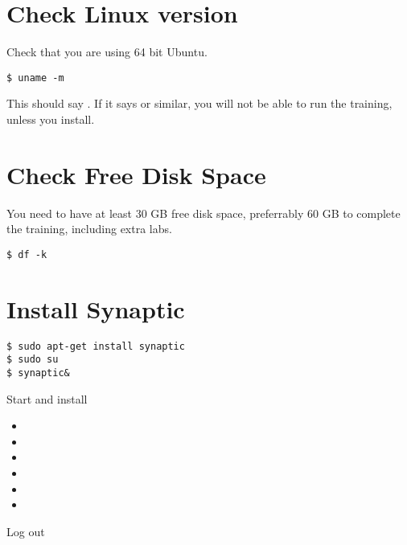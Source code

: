 
\section{Check Linux version}
Check that you are using 64 bit Ubuntu.

\begin{verbatim}
$ uname -m
\end{verbatim}

This should say . If it says 
or similar, you will not be able to run the training,
unless you install.

\section{Check Free Disk Space}

You need to have at least 30 GB free disk space, preferrably 60 GB
to complete the training, including extra labs.

\begin{verbatim}
$ df -k
\end{verbatim}

\section{Install Synaptic}

\begin{verbatim}
$ sudo apt-get install synaptic
$ sudo su
$ synaptic&
\end{verbatim}

Start  and install 


\begin{itemize}

\item {}

\item {}

\item {}

\item {}

\item {}

\item {}

\end{itemize}

Log out

